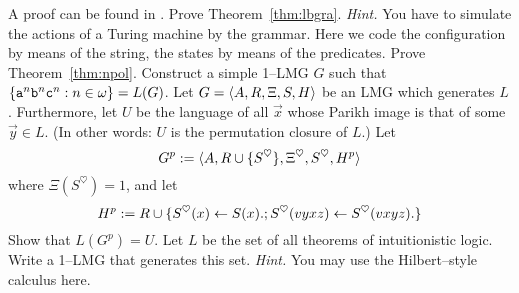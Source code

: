 A proof can be found in \cite{ebbinghausflum:finite}. 
\vplatz
\exercise
Prove Theorem~\ref{thm:lbgra}. {\it Hint.} You have to simulate
the actions of a Turing machine by the grammar. Here we code the
configuration by means of the string, the states by means of
the predicates.
\vplatz
\exercise
Prove Theorem~\ref{thm:npol}.
\vplatz
\exercise
Construct a simple 1--LMG $G$ such that 
$\{\mbox{\tt a}^n\mbox{\tt b}^n\mbox{\tt c}^n :
n \in \omega\} = L(G)$.
\vplatz
\exercise
Let $G = \langle A, R, \Xi, S, H\rangle$ be an LMG which generates
$L$. Furthermore, let $U$ be the language of all
$\vec{x}$ whose Parikh image is that of some $\vec{y} \in L$.
(In other words: $U$ is the permutation closure of $L$.)
Let 
\begin{equation}
G^p := \langle A, R \cup \{S^{\heartsuit}\}, \Xi^{\heartsuit},
S^{\heartsuit}, H^p\rangle
\end{equation}
where $\Xi(S^{\heartsuit}) = 1$, and let
\begin{equation}
H^p := R \cup \{S^{\heartsuit}(x) \leftarrow
    S(x).; S^{\heartsuit}(vyxz) \leftarrow S^{\heartsuit}(vxyz).\}
\end{equation}
Show that $L(G^p) = U$.
\vplatz
\exercise
Let $L$ be the set of all theorems of intuitionistic logic. Write
a 1--LMG that generates this set. {\it Hint.} You may use the
Hilbert--style calculus here.
